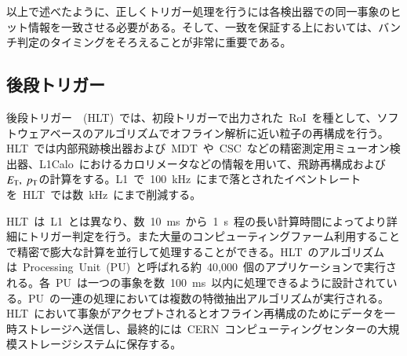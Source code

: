 以上で述べたように、正しくトリガー処理を行うには各検出器での同一事象のヒット情報を一致させる必要がある。そして、一致を保証する上においては、バンチ判定のタイミングをそろえることが非常に重要である。


\subsection{後段トリガー}
後段トリガー~\cite{AR:15}~(HLT)~では、初段トリガーで出力された~RoI~を種として、ソフトウェアベースのアルゴリズムでオフライン解析に近い粒子の再構成を行う。HLT~では内部飛跡検出器および~MDT~や~CSC~などの精密測定用ミューオン検出器、L1Calo~におけるカロリメータなどの情報を用いて、飛跡再構成および$E_{\rm{T}},~p_{\rm{T}}$の計算をする。L1~で~100~kHz~にまで落とされたイベントレートを~HLT~では数~kHz~にまで削減する。

HLT~は~L1~とは異なり、数~10~ms~から~1~s~程の長い計算時間によってより詳細にトリガー判定を行う。また大量のコンピューティングファーム利用することで精密で膨大な計算を並行して処理することができる。HLT~のアルゴリズムは~Processing~Unit~(PU)~と呼ばれる約~40,000~個のアプリケーションで実行される。各~PU~は一つの事象を数~100~ms~以内に処理できるように設計されている。PU~の一連の処理においては複数の特徴抽出アルゴリズムが実行される。HLT~において事象がアクセプトされるとオフライン再構成のためにデータを一時ストレージへ送信し、最終的には~CERN~コンピューティングセンターの大規模ストレージシステムに保存する。
